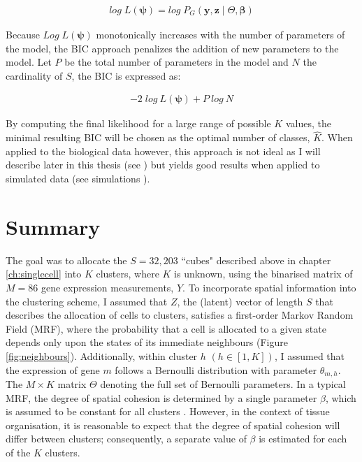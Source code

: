 \begin{align*}
log\;L(\boldsymbol{\psi}) = 	log\;P_G(\boldsymbol{y},\boldsymbol{z} \mid \Theta, \boldsymbol{\beta})
\end{align*}

Because $Log\;L(\boldsymbol{\psi})$ monotonically increases with the number of parameters of the model, the BIC approach penalizes the addition of new parameters to the model. Let $P$ be the total number of parameters in the model and $N$ the cardinality of $S$, the BIC is expressed as:

\begin{align*}
\label{eq:BIC}
- 2\; log\:L(\boldsymbol{\psi}) + P\:log\:N
\end{align*}

By computing the final likelihood for a large range of possible $K$ values, the minimal resulting BIC will be chosen as the optimal number of classes, $\hat{K}$. When applied to the biological data however, this approach is not ideal as I will describe later in this thesis (see ) but yields good results when applied to simulated data (see simulations ).\\

\section{Summary}
The goal was to allocate the $S=32,203$ ``cubes" described above in chapter \ref{ch:singlecell} into $K$ clusters, where $K$ is unknown, using the binarised matrix of $M=86$ gene expression measurements, $Y$. To incorporate spatial information into the clustering scheme, I assumed that $Z$, the (latent) vector of length $S$ that describes the allocation of cells to clusters, satisfies a first-order Markov Random Field (MRF), where the probability that a cell is allocated to a given state depends only upon the states of its immediate neighbours (Figure \ref{fig:neighbours}). Additionally, within cluster $h$ $(h \in [1,K])$, I assumed that the expression of gene $m$ follows a Bernoulli distribution with parameter $\theta_{m,h}$. The $M \times K$ matrix  $\Theta$ denoting the full set of Bernoulli parameters. In a typical MRF, the degree of spatial cohesion is determined by a single parameter $\beta$, which is assumed to be constant for all clusters \cite{subudhi14,zhang14}. However, in the context of tissue organisation, it is reasonable to expect that the degree of spatial cohesion will differ between clusters; consequently,  a separate value of $\beta$ is estimated for each of the $K$ clusters.\\

